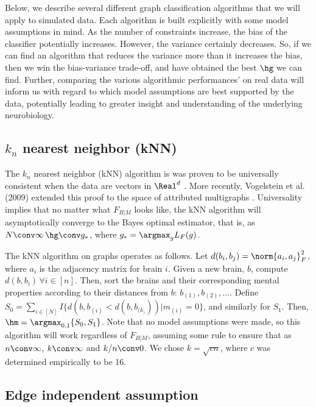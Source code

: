 \documentclass{article}
\begin{document}
Below, we describe several different graph classification algorithms that we will apply to simulated data.  Each algorithm is built explicitly with some model assumptions in mind.  As the number of constraints increase, the bias of the classifier potentially increases.  However, the variance certainly decreases.  So, if we can find an algorithm that reduces the variance more than it increases the bias, then we win the bias-variance trade-off, and have obtained the best $\hg$ we can find.  Further, comparing the various algorithmic performances' on real data will inform us with regard to which model assumptions are best supported by the data, potentially leading to greater insight and understanding of the underlying neurobiology.  

\subsection{$k_n$ nearest neighbor (kNN)} %
\label{sub:_k_n_nearest_neighbor_knn_}

The $k_n$ nearest neighbor (kNN) algorithm is was proven to be universally consistent when the data are vectors in $\Real^d$ \cite{Stone77}.  More recently, Vogelstein et al. (2009) extended this proof to the space of attributed multigraphs \cite{VVP09}.  Universality implies that no matter what $F_{B|M}$ looks like, the kNN algorithm will asymptotically converge to the Bayes optimal estimator, that is, as $N\conv\infty\, \hg \conv g_{\ast}$, where $g_{\ast}= \argmax_g L_F(g)$.  

The kNN algorithm on graphs operates as follows.  Let $d(b_i,b_j)=\norm{a_i,a_j}_F^2$, where $a_i$ is the adjacency matrix for brain $i$.  Given a new brain, $b$, compute $d(b,b_i)\, \forall i \in [n]$.  Then, sort the brains and their corresponding mental properties according to their distances from $b$: $b_{(1)}, b_{(2)}, \ldots$.  Define $S_0=\sum_{i \in [N]} I\{d(b,b_{(i)} < d(b,b_{(k_)})) | m_{(i)}=0\}$, and similarly for $S_1$. Then, $\hm=\argmax_{0,1} \{S_0,S_1\}$.  Note that no model assumptions were made, so this algorithm will work regardless of $F_{B|M}$, assuming some rule to ensure that as $n\conv \infty$, $k \conv \infty$ and $k/n \conv 0$.  We chose $k=\sqrt{c n}$, where $c$ was determined empirically to be 16.  



\subsection{Edge independent assumption} %
\label{sub:edge_indep}
\end{document}
